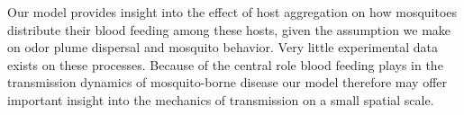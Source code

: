 \documentclass[12pt]{article}
\newif\ifcommentsw
\newcommand{\comment}[1]{\ifcommentsw  $\blacktriangleright$\ \textbf{#1}\ $\blacktriangleleft$ \fi}
\begin{document}
%
%
%
%



Our model provides insight into the effect of host aggregation on how mosquitoes distribute their blood feeding among these hosts, given the assumption we make on odor plume dispersal and mosquito behavior. Very little experimental data exists on these processes. Because of the central role blood feeding plays in the transmission dynamics of mosquito-borne disease our model therefore may offer important insight into the mechanics of transmission on a small spatial scale.
\end{document}

